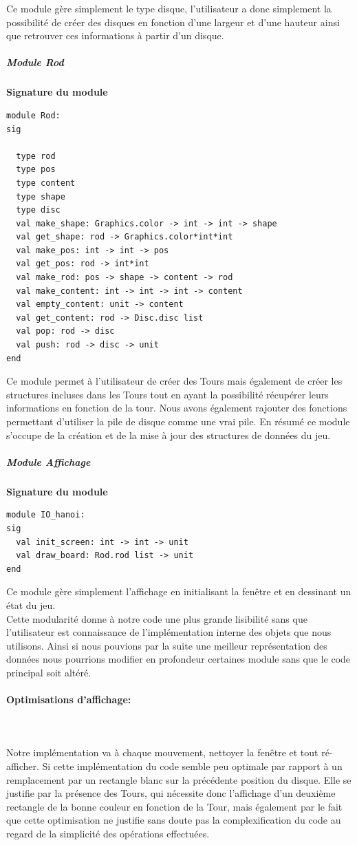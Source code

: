 \documentclass[a4paper,11pt]{article}
\begin{document}
Ce module gère simplement le type disque, l'utilisateur a donc simplement la possibilité de créer des disques en fonction d'une largeur et d'une hauteur ainsi que retrouver ces informations à partir d'un disque.

\subparagraph{Module Rod}
\begin{center}
\textbf{Signature du module}
\begin{lstlisting}
module Rod:
sig
  
  type rod
  type pos
  type content
  type shape
  type disc
  val make_shape: Graphics.color -> int -> int -> shape
  val get_shape: rod -> Graphics.color*int*int
  val make_pos: int -> int -> pos
  val get_pos: rod -> int*int
  val make_rod: pos -> shape -> content -> rod
  val make_content: int -> int -> int -> content
  val empty_content: unit -> content
  val get_content: rod -> Disc.disc list
  val pop: rod -> disc
  val push: rod -> disc -> unit    
end
\end{lstlisting}
\end{center}
Ce module permet à l'utilisateur de créer des Tours mais également de créer les structures incluses dans les Tours tout en ayant la possibilité récupérer leurs informations en fonction de la tour.
Nous avons également rajouter des fonctions permettant d'utiliser la pile de disque comme une vrai pile.
En résumé ce module s'occupe de la création et de la mise à jour des structures de données du jeu.

\subparagraph{Module Affichage}
\begin{center}
\textbf{Signature du module}
\begin{lstlisting}
module IO_hanoi:
sig
  val init_screen: int -> int -> unit
  val draw_board: Rod.rod list -> unit
end
\end{lstlisting}
\end{center}
Ce module gère simplement l'affichage en initialisant la fenêtre et en dessinant un état du jeu.
\\
Cette modularité donne à notre code une plus grande lisibilité sans que l'utilisateur est connaissance de l'implémentation interne des objets que nous utilisons.
Ainsi si nous pouvions par la suite une meilleur représentation des données nous pourrions modifier en profondeur certaines module sans que le code principal soit altéré.


\paragraph{Optimisations d'affichage:}\mbox{}\\\\
Notre implémentation va à chaque mouvement, nettoyer la fenêtre et tout ré-afficher.
Si cette implémentation du code semble peu optimale par rapport à un remplacement par un rectangle blanc sur la précédente position du disque.
Elle se justifie par la présence des Tours, qui nécessite donc l'affichage d'un deuxième rectangle de la bonne couleur en fonction de la Tour, mais également par le fait que cette optimisation ne justifie sans doute pas la complexification du code au regard de la simplicité des opérations effectuées.
\end{document}
